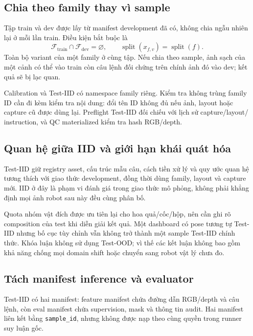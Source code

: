 \subsection{Chia theo family thay vì sample}

Tập train và dev được lấy từ manifest development đã có,
không chia ngẫu nhiên lại ở mỗi lần train. Điều kiện bắt buộc là
\begin{equation}
    \mathcal{F}_{\mathrm{train}}\cap
    \mathcal{F}_{\mathrm{dev}}=\varnothing,
    \qquad
    \operatorname{split}(x_{f,v})=\operatorname{split}(f).
\end{equation}
Toàn bộ variant của một family ở cùng tập. Nếu chia theo
sample, ảnh sạch của một cảnh có thể vào train còn câu lệnh
đối chứng trên chính ảnh đó vào dev; kết quả sẽ bị lạc quan.

Calibration và Test-IID có namespace family riêng. Kiểm tra
không trùng family ID cần đi kèm kiểm tra nội dung: đổi tên ID
không đủ nếu ảnh, layout hoặc capture cũ được dùng lại.
Preflight Test-IID đối chiếu với lịch sử capture/layout/
instruction, và QC materialized kiểm tra hash RGB/depth.

\subsection{Quan hệ giữa IID và giới hạn khái quát hóa}

Test-IID giữ registry asset, cấu trúc mẫu câu, cách tiền xử lý
và quy ước quan hệ tương thích với giao thức development,
đồng thời dùng family, layout và capture mới.
IID ở đây là phạm vi đánh giá trong giao thức mô phỏng,
không phải khẳng định mọi ảnh robot sau này đều cùng phân bố.

Quota nhóm vật đích được ưu tiên lại cho hoa quả/cốc/hộp,
nên cần ghi rõ composition của test khi diễn giải kết quả.
Một dashboard có pose tương tự Test-IID nhưng bố cục tùy
chỉnh vẫn không trở thành một sample Test-IID chính thức.
Khóa luận không sử dụng Test-OOD; vì thế các kết luận không
bao gồm khả năng chống mọi domain shift hoặc chuyển sang
robot vật lý chưa đo.

\subsection{Tách manifest inference và evaluator}

Test-IID có hai manifest: feature manifest chứa đường dẫn
RGB/depth và câu lệnh, còn eval manifest chứa supervision,
mask và thông tin audit. Hai manifest liên kết bằng
\texttt{sample\_\allowbreak id}, nhưng không được nạp theo cùng quyền
trong runner suy luận gốc.

